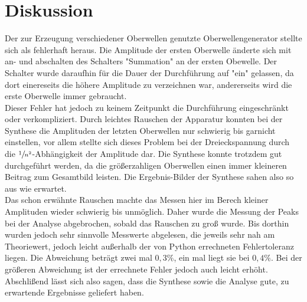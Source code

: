 \section{Diskussion}
\label{sec:Diskussion}
Der zur Erzeugung verschiedener Oberwellen genutzte Oberwellengenerator stellte sich als fehlerhaft heraus.
Die Amplitude der ersten Oberwelle änderte sich mit an- und abschalten des Schalters "Summation" an der ersten Obewelle.
Der Schalter wurde daraufhin für die Dauer der Durchführung auf "ein" gelassen, da dort einereseits die höhere Amplitude 
zu verzeichnen war, andererseits wird die erste Oberwelle immer gebraucht.\\  \noindent
Dieser Fehler hat jedoch zu keinem Zeitpunkt die Durchführung eingeschränkt oder verkompliziert. Durch leichtes Rauschen 
der Apparatur konnten bei der Synthese die Amplituden der letzten Oberwellen nur schwierig bis garnicht einstellen, vor allem
stellte sich dieses Problem bei der Dreieckspannung durch die $\sfrac{1}{n^2}$-Abhängigkeit der Amplitude dar. Die Synthese konnte 
trotzdem gut durchgeführt werden, da die größerzahligen Oberwellen einen immer kleineren Beitrag zum Gesamtbild leisten. Die Ergebnis-Bilder
der Synthese sahen also so aus wie erwartet. \\ \noindent
Das schon erwähnte Rauschen machte das Messen hier im Berech kleiner Amplituden wieder schwierig bis unmöglich. Daher wurde die Messung der Peaks
bei der Analyse abgebrochen, sobald das Rauschen zu groß wurde. Bis dorthin wurden jedoch sehr sinnvolle Messwerte abgelesen, die jeweils
sehr nah am Theoriewert, jedoch leicht außerhalb der von Python errechneten Fehlertoleranz liegen. Die Abweichung beträgt zwei mal 
$0,3\%$, ein mal liegt sie bei $0,4\%$. Bei der größeren Abweichung ist der errechnete Fehler jedoch auch leicht erhöht. Abschlißend lässt sich also
sagen, dass die Synthese sowie die Analyse gute, zu erwartende Ergebnisse geliefert haben.


